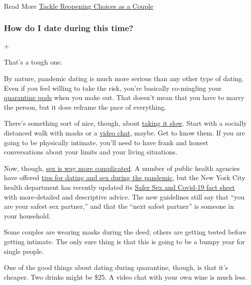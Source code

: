  Read More
\href{https://www.nytimes.com/2020/07/11/at-home/couples-coronavirus-pandemic.html}{Tackle
Reopening Choices as a Couple}

\hypertarget{how-do-i-date-during-this-time}{%
\subsubsection{How do I date during this
time?}\label{how-do-i-date-during-this-time}}

+

That's a tough one.

By nature, pandemic dating is much more serious than any other type of
dating. Even if you feel willing to take the risk, you're basically
co-mingling your
\href{https://www.nytimes.com/2020/06/09/parenting/coronavirus-pod-family.html}{quarantine
pods} when you make out. That doesn't mean that you have to marry the
person, but it does reframe the pace of everything.

There's something sort of nice, though, about
\href{https://www.nytimes.com/2020/05/21/style/first-date-during-quarantine-coronavirus.html}{taking
it slow}. Start with a socially distanced walk with masks or a
\href{https://www.nytimes.com/2020/04/18/nyregion/coronavirus-dating-video.html}{video
chat}, maybe. Get to know them. If you are going to be physically
intimate, you'll need to have frank and honest conversations about your
limits and your living situations.

Now, though,
\href{https://www.nytimes.com/2020/06/11/well/live/coronavirus-sex-dating-masks.html}{sex
is way more complicated}. A number of public health agencies have
offered
\href{https://www.nytimes.com/2020/05/20/world/netherlands-sex-buddies-coronavirus.html}{tips
for dating and sex during the pandemic}, but the New York City health
department has recently updated its
\href{https://www1.nyc.gov/assets/doh/downloads/pdf/imm/covid-sex-guidance.pdf}{Safer
Sex and Covid-19 fact sheet} with more-detailed and descriptive advice.
The new guidelines still say that ``you are your safest sex partner,''
and that the ``next safest partner'' is someone in your household.

Some couples are wearing masks during the deed; others are getting
tested before getting intimate. The only sure thing is that this is
going to be a bumpy year for single people.

One of the good things about dating during quarantine, though, is that
it's cheaper. Two drinks might be \$25. A video chat with your own wine
is much less.

